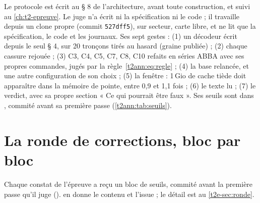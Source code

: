 Le protocole est écrit au § 8 de l'architecture, avant toute construction, et suivi au \cref{ch:t2-epreuve}. Le juge n'a écrit ni la spécification ni le code ; il travaille depuis un clone propre (commit \texttt{527dff5}), sur secteur, carte libre, et ne lit que la spécification, le code et les journaux. Ses sept gestes : (1) un décodeur écrit depuis le seul § 4, sur 20 tronçons tirés au hasard (graine publiée) ; (2) chaque cassure rejouée ; (3) C3, C4, C5, C7, C8, C10 refaits en séries ABBA avec ses propres commandes, jugés par la règle~\eqref{t2ann:eq:regle} ; (4) la base relancée, et une autre configuration de son choix ; (5) la fenêtre : 1\,Gio de cache tiède doit apparaître dans la mémoire de pointe, entre 0,9 et 1,1 fois ; (6) le texte lu ; (7) le verdict, avec sa propre section « Ce qui pourrait être faux ». Ses seuils sont dans , commité avant sa première passe (\cref{t2ann:tab:seuils}).

\section{La ronde de corrections, bloc par bloc}\label{t2ann:sec:ronde}

Chaque constat de l'épreuve a reçu un bloc de seuils, commité avant la première passe qu'il juge ().  en donne le contenu et l'issue ; le détail est au \cref{t2e-sec:ronde}.


